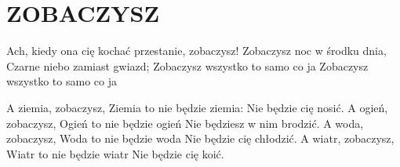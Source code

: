 \documentclass[../../../songbook.tex]{subfiles}
\begin{document}
\TabPositions{8cm} %
\section*{ZOBACZYSZ}
{}
\vspace{0.5cm}
Ach, kiedy ona cię kochać przestanie, zobaczysz! 	 \newline
Zobaczysz noc w środku dnia, 						 \newline
Czarne niebo zamiast gwiazd; 						 \newline
Zobaczysz wszystko to samo co ja 					 \newline
Zobaczysz wszystko to samo co ja 					 \newline

\-\hspace{1cm} A ziemia, zobaczysz,  			 \newline
\-\hspace{1cm} Ziemia to nie będzie ziemia: 	 \newline
\-\hspace{1cm} Nie będzie cię nosić. 			 \newline
\-\hspace{1cm} A ogień, zobaczysz, 				 \newline
\-\hspace{1cm} Ogień to nie będzie ogień		 \newline
\-\hspace{1cm} Nie będziesz w nim brodzić.		 \newline
\-\hspace{1cm} A woda, zobaczysz,				 \newline
\-\hspace{1cm} Woda to nie będzie woda			 \newline
\-\hspace{1cm} Nie będzie cię chłodzić.			 \newline
\-\hspace{1cm} A wiatr, zobaczysz, 				 \newline
\-\hspace{1cm} Wiatr to nie będzie wiatr		 \newline
\-\hspace{1cm} Nie będzie cię koić. 			 \newline
\end{document}
